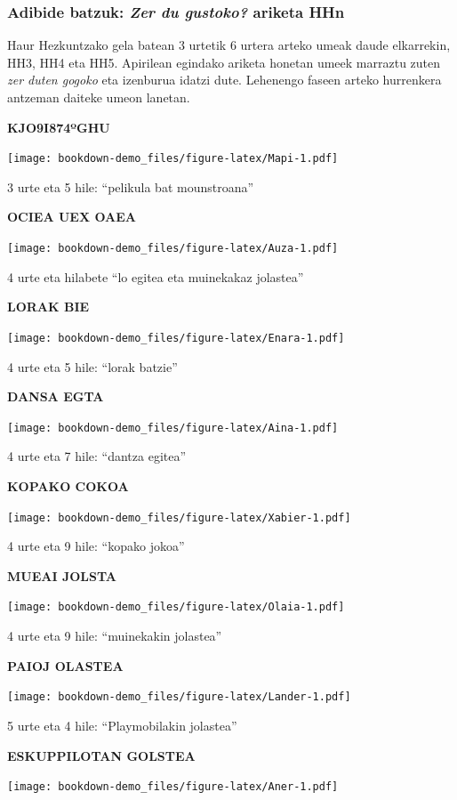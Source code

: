 \documentclass[
]{book}
\begin{document}
\hypertarget{adibide-batzuk-zer-du-gustoko-ariketa-hhn}{%
\subsubsection{\texorpdfstring{Adibide batzuk: \emph{Zer du gustoko?} ariketa HHn}{Adibide batzuk: Zer du gustoko? ariketa HHn}}\label{adibide-batzuk-zer-du-gustoko-ariketa-hhn}}

Haur Hezkuntzako gela batean 3 urtetik 6 urtera arteko umeak daude elkarrekin, HH3, HH4 eta HH5. Apirilean egindako ariketa honetan umeek marraztu zuten \emph{zer duten gogoko} eta izenburua idatzi dute. Lehenengo faseen arteko hurrenkera antzeman daiteke umeon lanetan.

\textbf{KJO9I874ºGHU}

\texttt{[image: bookdown-demo\_files/figure-latex/Mapi-1.pdf]}

3 urte eta 5 hile: ``pelikula bat mounstroana''

\textbf{OCIEA UEX OAEA}

\texttt{[image: bookdown-demo\_files/figure-latex/Auza-1.pdf]}

4 urte eta hilabete ``lo egitea eta muinekakaz jolastea''

\textbf{LORAK BIE}

\texttt{[image: bookdown-demo\_files/figure-latex/Enara-1.pdf]}

4 urte eta 5 hile: ``lorak batzie''

\textbf{DANSA EGTA}

\texttt{[image: bookdown-demo\_files/figure-latex/Aina-1.pdf]}

4 urte eta 7 hile: ``dantza egitea''

\textbf{KOPAKO COKOA}

\texttt{[image: bookdown-demo\_files/figure-latex/Xabier-1.pdf]}

4 urte eta 9 hile: ``kopako jokoa''

\textbf{MUEAI JOLSTA}

\texttt{[image: bookdown-demo\_files/figure-latex/Olaia-1.pdf]}

4 urte eta 9 hile: ``muinekakin jolastea''

\textbf{PAIOJ OLASTEA}

\texttt{[image: bookdown-demo\_files/figure-latex/Lander-1.pdf]}

5 urte eta 4 hile: ``Playmobilakin jolastea''

\textbf{ESKUPPILOTAN GOLSTEA}

\texttt{[image: bookdown-demo\_files/figure-latex/Aner-1.pdf]}
\end{document}
